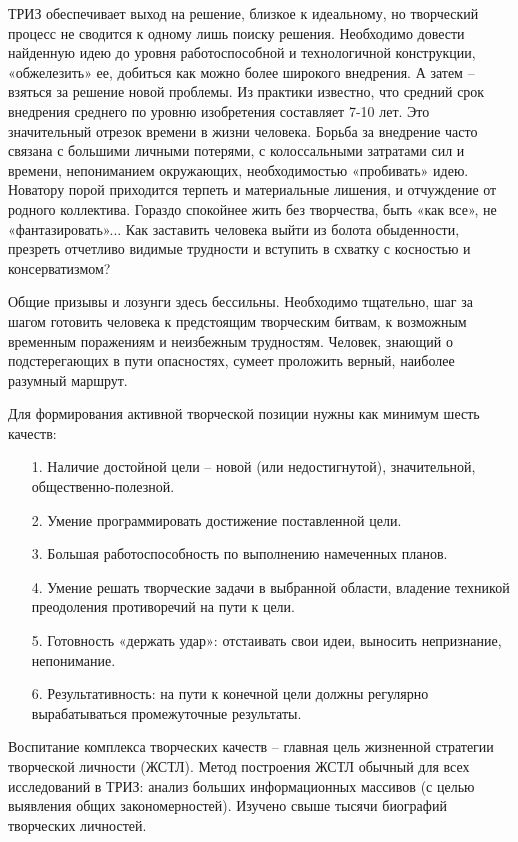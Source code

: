 \documentclass[11pt,a4paper]{article}
\begin{document}
ТРИЗ обеспечивает выход на решение, близкое к идеальному, но творческий
процесс не сводится к одному лишь поиску решения. Необходимо довести найденную
идею до уровня работоспособной и технологичной конструкции, «обжелезить» ее,
добиться как можно более широкого внедрения. А затем -- взяться за решение
новой проблемы. Из практики известно, что средний срок внедрения среднего по
уровню изобретения составляет 7-10 лет. Это значительный отрезок времени в
жизни человека. Борьба за внедрение часто связана с большими личными потерями,
с колоссальными затратами сил и времени, непониманием окружающих,
необходимостью «пробивать» идею. Новатору порой приходится терпеть и
материальные лишения, и отчуждение от родного коллектива. Гораздо спокойнее
жить без творчества, быть «как все», не «фантазировать»... Как заставить
человека выйти из болота обыденности, презреть отчетливо видимые трудности и
вступить в схватку с косностью и консерватизмом?

Общие призывы и лозунги здесь бессильны. Необходимо тщательно, шаг за шагом
готовить человека к предстоящим творческим битвам, к возможным временным
поражениям и неизбежным трудностям. Человек, знающий о подстерегающих в пути
опасностях, сумеет проложить верный, наиболее разумный маршрут.

Для формирования активной творческой позиции нужны как минимум шесть качеств:
\begin{itemize}[noitemsep]
\item[1.] Наличие достойной цели -- новой (или недостигнутой), значительной,
  общественно-полезной.
\item[2.] Умение программировать достижение поставленной цели.
\item[3.] Большая работоспособность по выполнению намеченных планов.
\item[4.] Умение решать творческие задачи в выбранной области, владение
  техникой преодоления противоречий на пути к цели.
\item[5.] Готовность «держать удар»: отстаивать свои идеи, выносить
  непризнание, непонимание.
\item[6.] Результативность: на пути к конечной цели должны регулярно
  вырабатываться промежуточные результаты.
\end{itemize}
Воспитание комплекса творческих качеств -- главная цель жизненной стратегии
творческой личности (ЖСТЛ). Метод построения ЖСТЛ обычный для всех
исследований в ТРИЗ: анализ больших информационных массивов (с целью выявления
общих закономерностей). Изучено свыше тысячи биографий творческих личностей.
\end{document}
